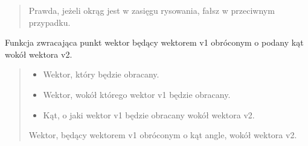 \documentclass[letterpaper,10pt,polish]{sphinxmanual}
\begin{document}
\begin{fulllineitems}
\begin{fulllineitems}
\begin{quote}
\begin{description}
\begin{itemize}
\end{itemize}

\sphinxAtStartPar
Prawda, jeżeli okrąg jest w zasięgu rysowania, fałsz w przeciwnym
przypadku.

\end{description}\end{quote}

\end{fulllineitems}


\begin{fulllineitems}
\label{\detokenize{main:main.Main.rotate_point}}
\pysigstartsignatures
{}
\pysigstopsignatures
\sphinxAtStartPar
Funkcja zwracająca punkt wektor będący wektorem v1 obróconym o
podany kąt wokół wektora v2.
\begin{quote}\begin{description}
\begin{itemize}
\item {} 
\sphinxAtStartPar
{} \textendash{} Wektor, który będzie obracany.

\item {} 
\sphinxAtStartPar
{} \textendash{} Wektor, wokół którego wektor v1 będzie obracany.

\item {} 
\sphinxAtStartPar
{} \textendash{} Kąt, o jaki wektor v1 będzie obracany wokół wektora v2.

\end{itemize}

\sphinxAtStartPar
Wektor, będący wektorem v1 obróconym o kąt angle, wokół wektora v2.

\end{description}\end{quote}

\end{fulllineitems}


\end{fulllineitems}
\end{document}
